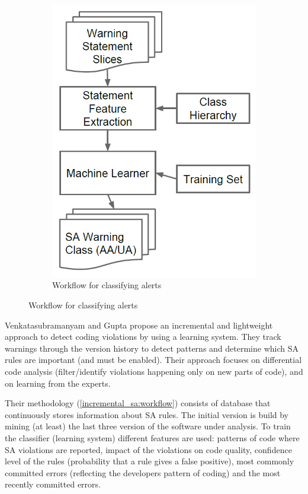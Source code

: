 \begin{figure}[H]
\begin{subfigure}{.5\textwidth}
         \includegraphics[scale=0.3]{./src/alert_patterns_workflow.png}
         \caption{Workflow for classifying alerts}\label{alert_patterns:workflow}
     \end{subfigure}
 \end{figure}


 Venkatasubramanyam and Gupta \cite{incremental_sa} propose an incremental and lightweight approach to detect coding violations by using a learning system. They track warnings through the version history to detect patterns and determine which SA rules are important (and must be enabled). Their approach focuses on differential code analysis (filter/identify violations happening only on new parts of code), and on learning from the experts.

 Their methodology (\cref{incremental_sa:workflow}) consists of database that continuously stores information about SA rules. The initial version is build by mining (at least) the last three version of the software under analysis. To train the classifier (learning system) different features are used: patterns of code where SA violations are reported, impact of the violations on code quality, confidence level of the rules (probability that a rule gives a false positive), most commonly committed errors (reflecting the developers pattern of coding) and the most recently committed errors.

